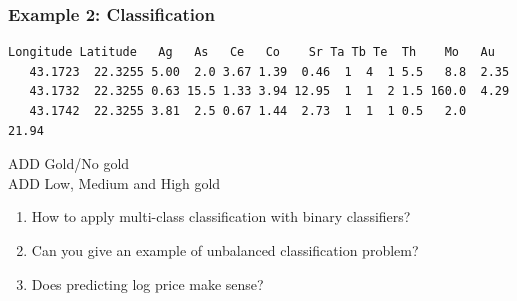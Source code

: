 \documentclass[14pt, handout]{beamer}
\begin{document}
\begin{frame}[fragile]\frametitle{Example 2: Classification}
	
{\scriptsize
\begin{verbatim}
Longitude Latitude   Ag   As   Ce   Co    Sr Ta Tb Te  Th    Mo   Au
   43.1723  22.3255 5.00  2.0 3.67 1.39  0.46  1  4  1 5.5   8.8  2.35
   43.1732  22.3255 0.63 15.5 1.33 3.94 12.95  1  1  2 1.5 160.0  4.29
   43.1742  22.3255 3.81  2.5 0.67 1.44  2.73  1  1  1 0.5   2.0  21.94
\end{verbatim}
}

ADD Gold/No gold \\
ADD Low, Medium and High gold

\begin{enumerate}
\item How to apply multi-class classification with binary classifiers?
\item Can you give an example of unbalanced classification problem?
\item Does predicting log price make sense?
\end{enumerate}

\end{frame}
\end{document}
